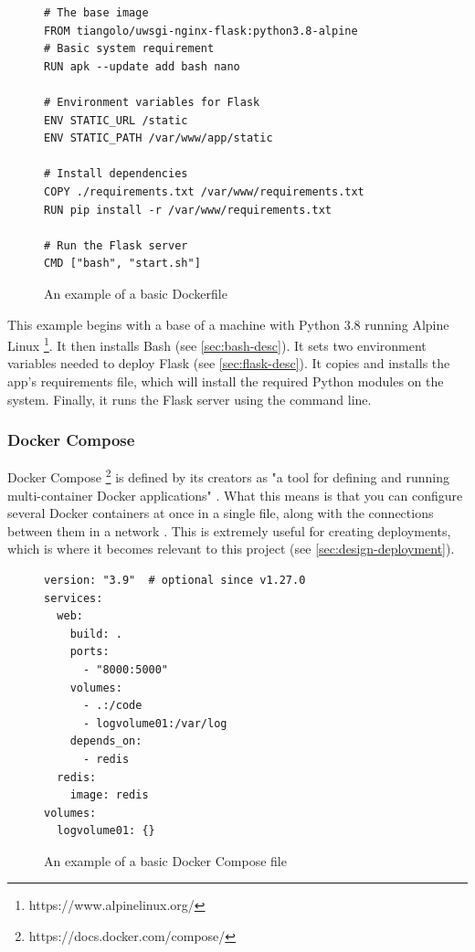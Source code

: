 \documentclass[12pt, letterpaper]{article}
\begin{document}
\begin{flushleft}
\begin{figure}[H]
\begin{verbatim}
# The base image
FROM tiangolo/uwsgi-nginx-flask:python3.8-alpine
# Basic system requirement
RUN apk --update add bash nano

# Environment variables for Flask
ENV STATIC_URL /static
ENV STATIC_PATH /var/www/app/static

# Install dependencies
COPY ./requirements.txt /var/www/requirements.txt
RUN pip install -r /var/www/requirements.txt

# Run the Flask server
CMD ["bash", "start.sh"] 
\end{verbatim}
\caption{An example of a basic Dockerfile \cite{docker-example}}
\end{figure}
\end{flushleft}

\begin{flushleft}
This example begins with a base of a machine with Python 3.8 running Alpine Linux \footnote{https://www.alpinelinux.org/}. It then installs Bash (see \ref{sec:bash-desc}). It sets two environment variables needed to deploy Flask (see \ref{sec:flask-desc}). It copies and installs the app's requirements file, which will install the required Python modules on the system. Finally, it runs the Flask server using the command line.
\end{flushleft}

\subsubsection{Docker Compose}\label{sec:docker-compose-desc}

\begin{flushleft}
Docker Compose \footnote{https://docs.docker.com/compose/} is defined by its creators as "a tool for defining and running multi-container Docker applications" \cite{docker-compose-example}. What this means is that you can configure several Docker containers at once in a single file, along with the connections between them in a network \cite{docker-compose-example}. This is extremely useful for creating deployments, which is where it becomes relevant to this project (see \ref{sec:design-deployment}).
\end{flushleft}

\begin{flushleft}
\begin{figure}[H]
\begin{verbatim}
version: "3.9"  # optional since v1.27.0
services:
  web:
    build: .
    ports:
      - "8000:5000"
    volumes:
      - .:/code
      - logvolume01:/var/log
    depends_on:
      - redis
  redis:
    image: redis
volumes:
  logvolume01: {}
\end{verbatim}
\caption{An example of a basic Docker Compose file \cite{docker-compose-example}}
\end{figure}
\end{flushleft}
\end{document}
